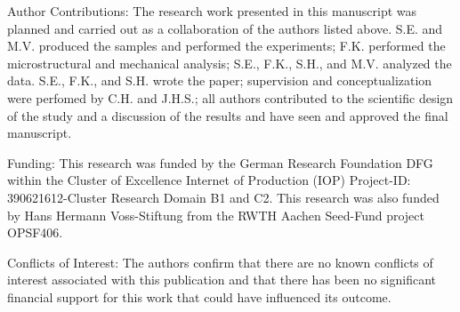 \documentclass[10pt]{article}
\begin{document}
Author Contributions: The research work presented in this manuscript was planned and carried out as a collaboration of the authors listed above. S.E. and M.V. produced the samples and performed the experiments; F.K. performed the microstructural and mechanical analysis; S.E., F.K., S.H., and M.V. analyzed the data. S.E., F.K., and S.H. wrote the paper; supervision and conceptualization were perfomed by C.H. and J.H.S.; all authors contributed to the scientific design of the study and a discussion of the results and have seen and approved the final manuscript.

Funding: This research was funded by the German Research Foundation DFG within the Cluster of Excellence Internet of Production (IOP) Project-ID: 390621612-Cluster Research Domain B1 and C2. This research was also funded by Hans Hermann Voss-Stiftung from the RWTH Aachen Seed-Fund project OPSF406.

Conflicts of Interest: The authors confirm that there are no known conflicts of interest associated with this publication and that there has been no significant financial support for this work that could have influenced its outcome.
\end{document}
